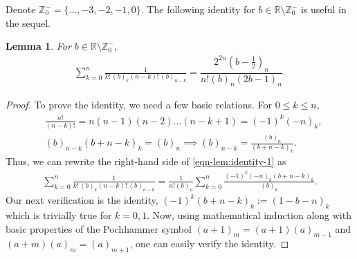 \documentclass[a4paper,11pt,reqno]{amsart}
\newtheorem{lemma}{Lemma}
\begin{document}
 Denote $\mathbb{Z}_0^{-}=\{\ldots, -3, -2, -1, 0\}$. The following identity for $b \in \mathbb{R}\setminus \mathbb{Z}_0^{-}$ is useful in the sequel. 
\begin{lemma}\label{lem:identity-1}
For  $b \in \mathbb{R}\setminus \mathbb{Z}_0^{-}$, 
\begin{align}\label{eqn-lem:identity-1}
    \sum_{k=0}^{n} \frac{1}{k!\,(b)_k (n-k)!\,(b)_{n-k}}= \dfrac{2^{2n} \left(b-\tfrac{1}{2}\right)_n}{n! (b)_n (2b-1)_n}.
\end{align}

\end{lemma}
\begin{proof}
    To prove the identity, we need a few basic relations. 
    For $0\le k \le n$,
    \begin{align*}
        &\frac{n!}{(n-k)!}= n(n-1) (n-2)\ldots(n-k+1)= (-1)^k (-n)_k, \\
       & (b)_{n-k}(b+n-k)_k=(b)_n \implies  (b)_{n-k}= \frac{(b)_n}{(b+n-k)_k}.
    \end{align*}
    Thus, we can rewrite the right-hand side of \eqref{eqn-lem:identity-1} as
    \begin{align}
       \sum_{k=0}^{n} \frac{1}{k!\,(b)_k (n-k)!\,(b)_{n-k}}= \frac{1}{n! (b)_n} \sum_{k=0}^{n} \frac{(-1)^k (-n)_k (b+n-k)_k}{(b)_k }. 
    \end{align}
Our next verification is the identity, $(-1)^k  (b+n-k)_k := (1-b-n)_k$ which is trivially true for $k=0, 1$. Now, using mathematical induction along with basic properties of the Pochhammer symbol $(a+1)_m=(a+1) (a)_{m-1}$ and  $(a+m) (a)_m =(a)_{m+1}$, one can easily verify the identity. 


\end{proof}
\end{document}
